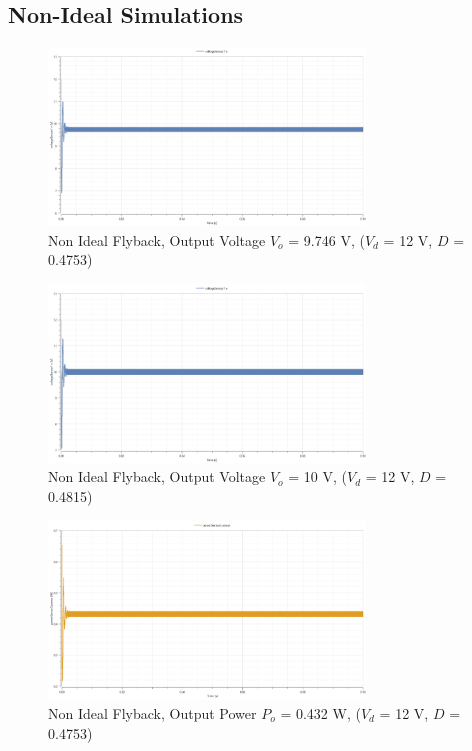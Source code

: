 \documentclass[12pt,twoside]{scrartcl}
\begin{document}
\newpage

\subsection{Non-Ideal Simulations}
\begin{figure}[htp]
    \centering
    \includegraphics[width=0.75\textwidth]{NonIdealSim12V(calculated).png}
    \caption{Non Ideal Flyback, Output Voltage $V_o$ = 9.746 V, ($V_d$ = 12 V, $D$ = 0.4753)}
    \label{fig:NonIdealSim12Vcal}
\end{figure}

\begin{figure}[htp]
    \centering
    \includegraphics[width=0.75\textwidth]{NonIdealSim12V(tested).png}
    \caption{Non Ideal Flyback, Output Voltage $V_o$ = 10 V, ($V_d$ = 12 V, $D$ = 0.4815)}
    \label{fig:NonIdealSim12Vtested}
\end{figure}

\begin{figure}[htp]
    \centering
    \includegraphics[width=0.75\textwidth]{PowerNonIdealSim12V.png}
    \caption{Non Ideal Flyback, Output Power $P_o$ = 0.432 W, ($V_d$ = 12 V, $D$ = 0.4753)}
    \label{fig:PowerNonIdealSim12V}
\end{figure}
\end{document}
